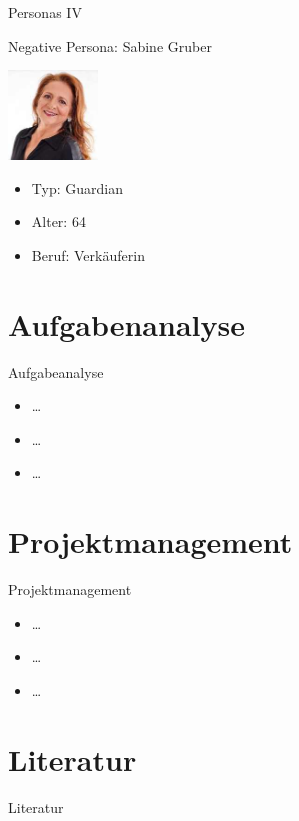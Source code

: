 \documentclass[presentation,bigger,aspectratio=169]{beamer}
\begin{document}
\begin{frame}[label={sec:orgbc096f5}]{Personas IV}
\begin{block}{Negative Persona: Sabine Gruber}
\begin{center}
\includegraphics[width=90px]{./img/m1_persona_4_guardian.jpg}
\end{center}
\begin{itemize}
\item Typ: Guardian
\item Alter: 64
\item Beruf: Verkäuferin
\end{itemize}
\end{block}
\end{frame}
\section{Aufgabenanalyse}
\label{sec:org053713e}
\begin{frame}[label={sec:orgc3916a8}]{\vspace{2.2cm}\begin{center}\MakeUppercase{\insertsection}\end{center}}
\end{frame}

\begin{frame}[label={sec:orgece9aeb}]{Aufgabeanalyse}
\begin{itemize}
\item \ldots{}
\item \ldots{}
\item \ldots{}
\end{itemize}
\end{frame}
\section{Projektmanagement}
\label{sec:org7b7c604}
\begin{frame}[label={sec:orgbf247ba}]{\vspace{2.2cm}\begin{center}\MakeUppercase{\insertsection}\end{center}}
\end{frame}

\begin{frame}[label={sec:org3e29730}]{Projektmanagement}
\begin{itemize}
\item \ldots{}
\item \ldots{}
\item \ldots{}
\end{itemize}
\end{frame}
\section*{Literatur}
\label{sec:org2ce82d3}
\begin{frame}[allowframebreaks]{Literatur}
\printbibliography[heading=none]
\end{frame}
\appendix
\end{document}
